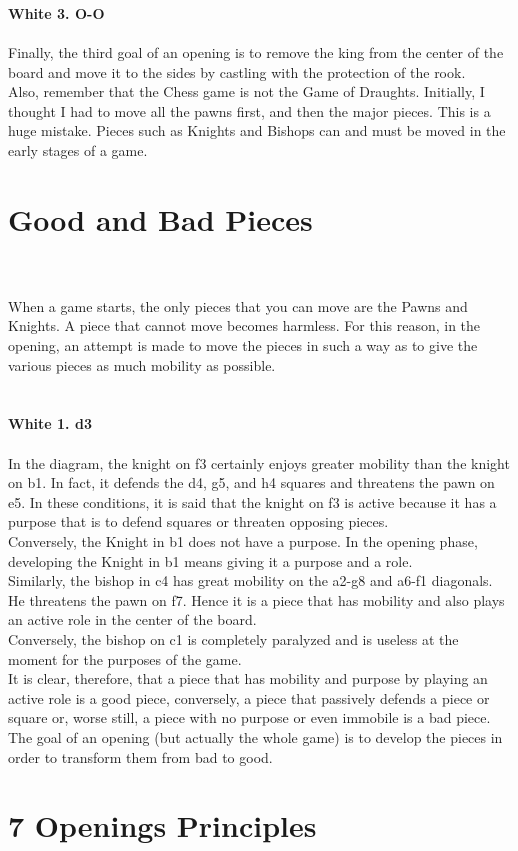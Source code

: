 \documentclass{article}
\begin{document}
\\

\\
\\
\textbf{White 3. O-O}\\
\\
Finally, the third goal of an opening is to remove the king from the center of the board and move it to the sides by castling with the protection of the rook.\\Also, remember that the Chess game is not the Game of Draughts. Initially, I thought I had to move all the pawns first, and then the major pieces. This is a huge mistake. Pieces such as Knights and Bishops can and must be moved in the early stages of a game.\section{ Good and Bad Pieces}

\\
\\
When a game starts, the only pieces that you can move are the Pawns and Knights. A piece that cannot move becomes harmless. For this reason, in the opening, an attempt is made to move the pieces in such a way as to give the various pieces as much mobility as possible.\\

\\
\\
\textbf{White 1. d3}\\
\\
In the diagram, the knight on f3 certainly enjoys greater mobility than the knight on b1. In fact, it defends the d4, g5, and h4 squares and threatens the pawn on e5. In these conditions, it is said that the knight on f3 is active because it has a purpose that is to defend squares or threaten opposing pieces.\\Conversely, the Knight in b1 does not have a purpose. In the opening phase, developing the Knight in b1 means giving it a purpose and a role.\\Similarly, the bishop in c4 has great mobility on the a2-g8 and a6-f1 diagonals. He threatens the pawn on f7. Hence it is a piece that has mobility and also plays an active role in the center of the board.\\Conversely, the bishop on c1 is completely paralyzed and is useless at the moment for the purposes of the game.\\It is clear, therefore, that a piece that has mobility and purpose by playing an active role is a good piece, conversely, a piece that passively defends a piece or square or, worse still, a piece with no purpose or even immobile is a bad piece. The goal of an opening (but actually the whole game) is to develop the pieces in order to transform them from bad to good.\\\section{ 7 Openings Principles}
\end{document}
